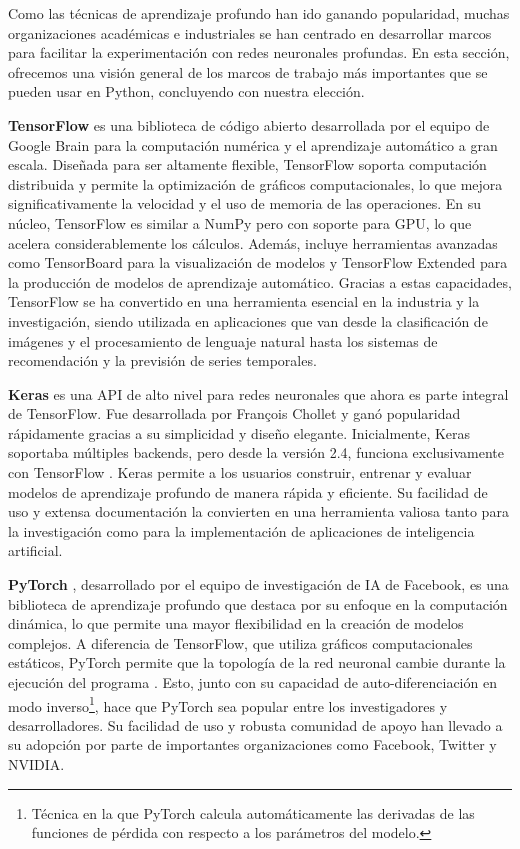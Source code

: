 Como las técnicas de aprendizaje profundo han ido ganando popularidad, muchas organizaciones académicas e industriales se han centrado en desarrollar marcos para facilitar la experimentación con redes neuronales profundas. En esta sección, ofrecemos una visión general de los marcos de trabajo más importantes que se pueden usar en Python, concluyendo con nuestra elección.


\textbf{TensorFlow} \citep{tensorflow} es una biblioteca de código abierto desarrollada por el equipo de Google Brain para la computación numérica y el aprendizaje automático a gran escala. Diseñada para ser altamente flexible, TensorFlow soporta computación distribuida y permite la optimización de gráficos computacionales, lo que mejora significativamente la velocidad y el uso de memoria de las operaciones. En su núcleo, TensorFlow es similar a NumPy pero con soporte para GPU, lo que acelera considerablemente los cálculos. Además, incluye herramientas avanzadas como TensorBoard para la visualización de modelos y TensorFlow Extended para la producción de modelos de aprendizaje automático. Gracias a estas capacidades, TensorFlow se ha convertido en una herramienta esencial en la industria y la investigación, siendo utilizada en aplicaciones que van desde la clasificación de imágenes y el procesamiento de lenguaje natural hasta los sistemas de recomendación y la previsión de series temporales.


\textbf{Keras} \citep{keras} es una API de alto nivel para redes neuronales que ahora es parte integral de TensorFlow. Fue desarrollada por François Chollet y ganó popularidad rápidamente gracias a su simplicidad y diseño elegante. Inicialmente, Keras soportaba múltiples backends, pero desde la versión 2.4, funciona exclusivamente con TensorFlow \citep{muller2016introduction}. Keras permite a los usuarios construir, entrenar y evaluar modelos de aprendizaje profundo de manera rápida y eficiente. Su facilidad de uso y extensa documentación la convierten en una herramienta valiosa tanto para la investigación como para la implementación de aplicaciones de inteligencia artificial.



\textbf{PyTorch} \citep{pytorch}, desarrollado por el equipo de investigación de IA de Facebook, es una biblioteca de aprendizaje profundo que destaca por su enfoque en la computación dinámica, lo que permite una mayor flexibilidad en la creación de modelos complejos. A diferencia de TensorFlow, que utiliza gráficos computacionales estáticos, PyTorch permite que la topología de la red neuronal cambie durante la ejecución del programa \citep{mahmoud2019dlbench}. Esto, junto con su capacidad de auto-diferenciación en modo inverso\footnote{Técnica en la que PyTorch calcula automáticamente las derivadas de las funciones de pérdida con respecto a los parámetros del modelo.}, hace que PyTorch sea popular entre los investigadores y desarrolladores. Su facilidad de uso y robusta comunidad de apoyo han llevado a su adopción por parte de importantes organizaciones como Facebook, Twitter y NVIDIA.




